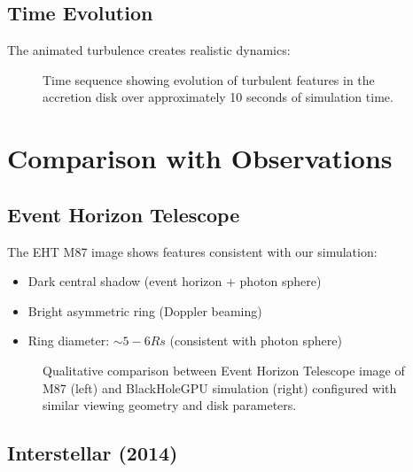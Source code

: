\documentclass[12pt,a4paper]{article}
\theoremstyle{definition}
\theoremstyle{remark}
\begin{document}
\subsection{Time Evolution}

The animated turbulence creates realistic dynamics:

\begin{figure}[H]
    \centering
    \caption{Time sequence showing evolution of turbulent features in the accretion disk over approximately 10 seconds of simulation time.}
    \label{fig:time_evolution}
\end{figure}

\section{Comparison with Observations}

\subsection{Event Horizon Telescope}

The EHT M87 image shows features consistent with our simulation:

\begin{itemize}
    \item Dark central shadow (event horizon + photon sphere)
    \item Bright asymmetric ring (Doppler beaming)
    \item Ring diameter: $\sim 5-6 Rs$ (consistent with photon sphere)
\end{itemize}

\begin{figure}[H]
    \centering
    \caption{Qualitative comparison between Event Horizon Telescope image of M87 (left) and BlackHoleGPU simulation (right) configured with similar viewing geometry and disk parameters.}
    \label{fig:eht_comparison}
\end{figure}

\subsection{Interstellar (2014)}
\end{document}
